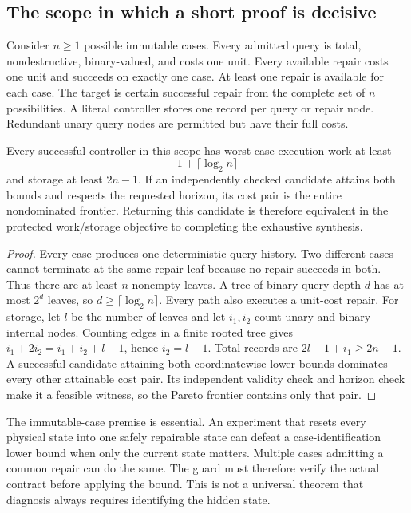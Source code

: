 \subsection{The scope in which a short proof is decisive}
Consider $n\geq1$ possible immutable cases. Every admitted query is total, nondestructive, binary-valued, and costs one unit. Every available repair costs one unit and succeeds on exactly one case. At least one repair is available for each case. The target is certain successful repair from the complete set of $n$ possibilities. A literal controller stores one record per query or repair node. Redundant unary query nodes are permitted but have their full costs.

\begin{SIItheorem}\label{SII:thm:optimality-stop}
Every successful controller in this scope has worst-case execution work at least
\[
1+\lceil\log_2 n\rceil
\]
and storage at least $2n-1$. If an independently checked candidate attains both bounds and respects the requested horizon, its cost pair is the entire nondominated frontier. Returning this candidate is therefore equivalent in the protected work/storage objective to completing the exhaustive synthesis.
\end{SIItheorem}
\begin{proof}
Every case produces one deterministic query history. Two different cases cannot terminate at the same repair leaf because no repair succeeds in both. Thus there are at least $n$ nonempty leaves. A tree of binary query depth $d$ has at most $2^d$ leaves, so $d\geq\lceil\log_2 n\rceil$. Every path also executes a unit-cost repair. For storage, let $l$ be the number of leaves and let $i_1,i_2$ count unary and binary internal nodes. Counting edges in a finite rooted tree gives $i_1+2i_2=i_1+i_2+l-1$, hence $i_2=l-1$. Total records are $2l-1+i_1\geq2n-1$. A successful candidate attaining both coordinatewise lower bounds dominates every other attainable cost pair. Its independent validity check and horizon check make it a feasible witness, so the Pareto frontier contains only that pair.
\end{proof}

The immutable-case premise is essential. An experiment that resets every physical state into one safely repairable state can defeat a case-identification lower bound when only the current state matters. Multiple cases admitting a common repair can do the same. The guard must therefore verify the actual contract before applying the bound. This is not a universal theorem that diagnosis always requires identifying the hidden state.

